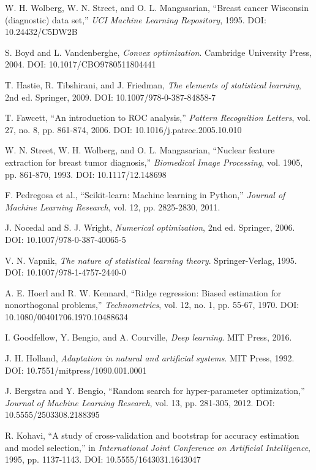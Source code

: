 \documentclass[conference]{IEEEtran}
\begin{document}
\begin{thebibliography}{00}
 W. H. Wolberg, W. N. Street, and O. L. Mangasarian, ``Breast cancer Wisconsin (diagnostic) data set,'' \textit{UCI Machine Learning Repository}, 1995. DOI: 10.24432/C5DW2B

 S. Boyd and L. Vandenberghe, \textit{Convex optimization}. Cambridge University Press, 2004. DOI: 10.1017/CBO9780511804441

 T. Hastie, R. Tibshirani, and J. Friedman, \textit{The elements of statistical learning}, 2nd ed. Springer, 2009. DOI: 10.1007/978-0-387-84858-7

 T. Fawcett, ``An introduction to ROC analysis,'' \textit{Pattern Recognition Letters}, vol. 27, no. 8, pp. 861-874, 2006. DOI: 10.1016/j.patrec.2005.10.010

 W. N. Street, W. H. Wolberg, and O. L. Mangasarian, ``Nuclear feature extraction for breast tumor diagnosis,'' \textit{Biomedical Image Processing}, vol. 1905, pp. 861-870, 1993. DOI: 10.1117/12.148698

 F. Pedregosa et al., ``Scikit-learn: Machine learning in Python,'' \textit{Journal of Machine Learning Research}, vol. 12, pp. 2825-2830, 2011.

 J. Nocedal and S. J. Wright, \textit{Numerical optimization}, 2nd ed. Springer, 2006. DOI: 10.1007/978-0-387-40065-5

 V. N. Vapnik, \textit{The nature of statistical learning theory}. Springer-Verlag, 1995. DOI: 10.1007/978-1-4757-2440-0

 A. E. Hoerl and R. W. Kennard, ``Ridge regression: Biased estimation for nonorthogonal problems,'' \textit{Technometrics}, vol. 12, no. 1, pp. 55-67, 1970. DOI: 10.1080/00401706.1970.10488634

 I. Goodfellow, Y. Bengio, and A. Courville, \textit{Deep learning}. MIT Press, 2016.

 J. H. Holland, \textit{Adaptation in natural and artificial systems}. MIT Press, 1992. DOI: 10.7551/mitpress/1090.001.0001

 J. Bergstra and Y. Bengio, ``Random search for hyper-parameter optimization,'' \textit{Journal of Machine Learning Research}, vol. 13, pp. 281-305, 2012. DOI: 10.5555/2503308.2188395

 R. Kohavi, ``A study of cross-validation and bootstrap for accuracy estimation and model selection,'' in \textit{International Joint Conference on Artificial Intelligence}, 1995, pp. 1137-1143. DOI: 10.5555/1643031.1643047


\end{thebibliography}
\end{document}
